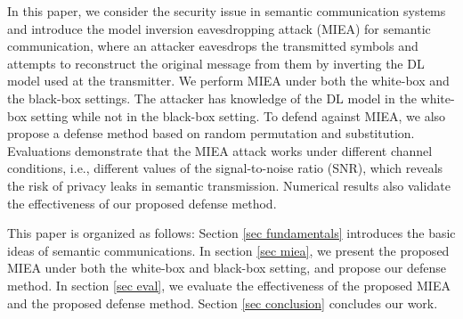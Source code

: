 \documentclass[conference]{IEEEtran}
\begin{document}
In this paper, we consider the security issue in semantic communication systems and introduce the model inversion eavesdropping attack (MIEA) for semantic communication, where an attacker eavesdrops the transmitted symbols and attempts to reconstruct the original message from them by inverting the DL model used at the transmitter. We perform MIEA under both the white-box and the black-box settings. The attacker has knowledge of the DL model in the white-box setting while not in the black-box setting. To defend against MIEA, we also propose a defense method based on random permutation and substitution. Evaluations demonstrate that the MIEA attack works under different channel conditions, i.e., different values of the signal-to-noise ratio (SNR), which reveals the risk of privacy leaks in semantic transmission. Numerical results also validate the effectiveness of our proposed defense method.



This paper is organized as follows: Section \ref{sec fundamentals} introduces the basic ideas of semantic communications. In section \ref{sec miea}, we present the proposed MIEA under both the white-box and black-box setting, and propose our defense method. In section \ref{sec eval}, we evaluate the effectiveness of the proposed MIEA and the proposed defense method. Section \ref{sec conclusion} concludes our work. 
\end{document}
